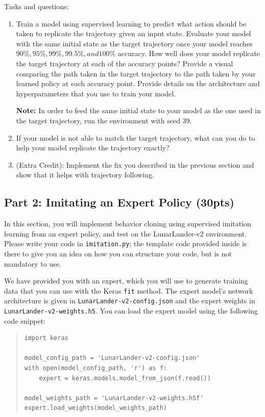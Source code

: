 \documentclass[12pt]{article}
\begin{document}
Tasks and questions:
\begin{enumerate}
    \item Train a model using supervised learning to predict what action should be taken to replicate the trajectory given an input state.  Evaluate your model with the same initial state as the target trajectory once your model reaches $90\%, 95\%, 99\%, 99.5\%, and 100\%$ accuracy. How well does your model replicate the target trajectory at each of the accuracy points?  Provide a visual comparing the path taken in the target trajectory to the path taken by your learned policy at each accuracy point.  Provide details on the architecture and hyperparameters that you use to train your model.  
    
    \textbf{Note:} In order to feed the same initial state to your model as the one used in the target trajectory, run the environment with seed 39.
    \begin{solution}
    \end{solution}
    \item If your model is not able to match the target trajectory, what can you do to help your model replicate the trajectory exactly?  
    \begin{solution}
    \end{solution}
    \item (Extra Credit): Implement the fix you described in the previous section and show that it helps with trajectory following.
    \begin{solution}
    \end{solution}
    
\end{enumerate}

\subsection*{Part 2: Imitating an Expert Policy (30pts)}

In this section, you will implement behavior cloning using supervised imitation learning from an expert policy, and test on the LunarLander-v2 environment. Please write your code in \texttt{imitation.py}; the template code provided inside is there to give you an idea on how you can structure your code, but is not mandatory to use.

We have provided you with an expert, which you will use to generate training data that you can use with the Keras \texttt{fit} method. The expert model's network architecture is given in \texttt{LunarLander-v2-config.json} and the expert weights in \texttt{LunarLander-v2-weights.h5}. You can load the expert model using the following code snippet:
\begin{quote}
\begin{verbatim}
import keras

model_config_path = 'LunarLander-v2-config.json'
with open(model_config_path, 'r') as f:
    expert = keras.models.model_from_json(f.read())

model_weights_path = 'LunarLander-v2-weights.h5f'
expert.load_weights(model_weights_path)
\end{verbatim}
\end{quote}
\end{document}
